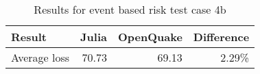 \begin{table}[htbp]

\centering
\begin{tabular}{ l r r r }

\hline
\rowcolor{anti-flashwhite}
\bf{Result} & \bf{Julia} & \bf{OpenQuake} & \bf{Difference}\\
\hline
Average loss & 70.73 & 69.13 & 2.29\% \\
\hline
\end{tabular}

\caption{Results for event based risk test case 4b}
\label{tab:result-ebr-4b}
\end{table}